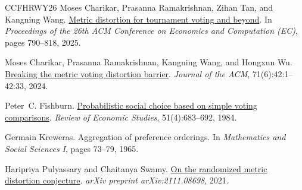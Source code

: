 \documentclass[11pt]{article}
\numberwithin{equation}{section}
\theoremstyle{plain}
\theoremstyle{definition}
\newcommand{\1}{\mathbf{1}}
\begin{document}
\begin{thebibliography}{CCFHRWY26}
Moses Charikar, Prasanna Ramakrishnan, Zihan Tan, and Kangning Wang.
\newblock \href{https://arxiv.org/abs/2505.13630}{Metric distortion for tournament voting and beyond}.
\newblock In \emph{Proceedings of the 26th ACM Conference on Economics and Computation (EC)}, pages 790--818, 2025.

Moses Charikar, Prasanna Ramakrishnan, Kangning Wang, and Hongxun Wu.
\newblock \href{https://doi.org/10.1145/3689625}{Breaking the metric voting distortion barrier}.
\newblock \emph{Journal of the ACM}, 71(6):42:1--42:33, 2024.

Peter~C. Fishburn.
\newblock \href{https://doi.org/10.2307/2297786}{Probabilistic social choice based on simple voting comparisons}.
\newblock \emph{Review of Economic Studies}, 51(4):683--692, 1984.

Germain Kreweras.
\newblock Aggregation of preference orderings.
\newblock In \emph{Mathematics and Social Sciences I}, pages 73--79, 1965.

Haripriya Pulyassary and Chaitanya Swamy.
\newblock \href{https://arxiv.org/abs/2111.08698}{On the randomized metric distortion conjecture}.
\newblock \emph{arXiv preprint arXiv:2111.08698}, 2021.

\end{thebibliography}
\endgroup
\end{document}
